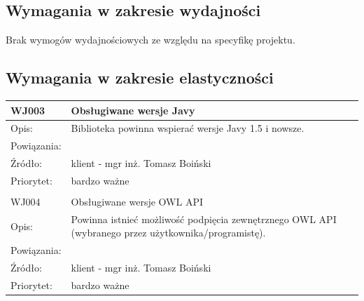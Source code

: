 \documentclass[a4paper,10pt]{article}
\begin{document}
\subsection{Wymagania w zakresie wydajności}


Brak wymogów wydajnościowych ze względu na specyfikę projektu.





\subsection{Wymagania w zakresie elastyczności}


\begin{center}

\begin{tabular}{|m{3cm}|m{9cm}|} \hline

WJ003 & Obsługiwane wersje Javy \\ \hline
Opis: & Biblioteka powinna wspierać wersje Javy 1.5 i nowsze.\\ \hline
Powiązania: &  \\ \hline
Źródło: & klient - mgr inż. Tomasz Boiński \\ \hline
Priorytet: & bardzo ważne \\ \hline

\multicolumn{2}{c}{} \\
 \hline

WJ004 & Obsługiwane wersje OWL API \\ \hline
Opis: & Powinna istnieć możliwość podpięcia zewnętrznego OWL API (wybranego przez użytkownika/programistę).\\ \hline
Powiązania: &  \\ \hline
Źródło: & klient - mgr inż. Tomasz Boiński \\ \hline
Priorytet: & bardzo ważne \\ \hline

\end{tabular}

\end{center}
\end{document}
